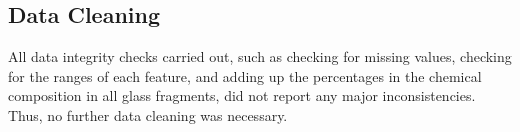 \subsection{Data Cleaning}
All data integrity checks carried out, such as checking for missing values, checking for the ranges of each feature, and adding up the percentages in the chemical composition in all glass fragments, did not report any major inconsistencies. Thus, no further data cleaning was necessary.


